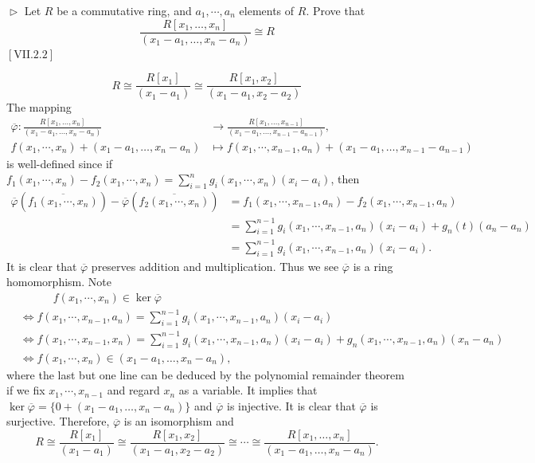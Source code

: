 \documentclass[12pt,letterpaper,boxed]{hmcpset}
\begin{document}
\hypertarget{Exercise III.4.12}{}
\begin{problem}[4.12]
	$\vartriangleright$ Let $R$ be a commutative ring, and $a_{1}, \cdots, a_{n}$ elements of $R .$ Prove that
	\[
	\frac{R\left[x_{1}, \ldots, x_{n}\right]}{\left(x_{1}-a_{1}, \ldots, x_{n}-a_{n}\right)} \cong R
	\]
	$[\mathrm{VII} .2 .2]$	
\end{problem}
\begin{solution}
	\[
	R\cong \frac{R\left[x_{1}\right]}{\left(x_{1}-a_{1}\right)}\cong \frac{R\left[x_{1},x_{2}\right]}{\left(x_{1}-a_{1},x_2-a_2\right)}
	\]
	The mapping
	\begin{align*}
	\overline{\varphi}:\frac{R\left[x_{1}, \ldots, x_{n}\right]}{\left(x_{1}-a_{1}, \ldots, x_{n}-a_{n}\right)}& \longrightarrow \frac{R\left[x_{1}, \ldots, x_{n-1}\right]}{\left(x_{1}-a_{1}, \ldots, x_{n-1}-a_{n-1}\right)},\\
	f(x_1,\cdots,x_n)+\left(x_{1}-a_{1}, \ldots, x_{n}-a_{n}\right)& \longmapsto f(x_1,\cdots,x_{n-1},a_n)+\left(x_{1}-a_{1}, \ldots, x_{n-1}-a_{n-1}\right)
	\end{align*}
	is well-defined since if $f_1\left(x_1,\cdots,x_n\right)-f_2\left(x_1,\cdots,x_n\right)=\sum\limits_{i=1}^n g_i(x_1,\cdots,x_n)(x_i-a_i)$, then
	\begin{align*}
	\overline{\varphi}\left(\overline{f_1(x_1,\cdots,x_n)}\right)-\overline{\varphi}\left(\overline{f_2(x_1,\cdots,x_n)}\right)&=f_1(x_1,\cdots,x_{n-1},a_n)-f_2(x_1,\cdots,x_{n-1},a_n)\\
	&=\sum_{i=1}^{n-1} g_i(x_1,\cdots,x_{n-1},a_n)(x_i-a_i)+g_n(t)(a_n-a_n)\\
	&=\sum_{i=1}^{n-1} g_i(x_1,\cdots,x_{n-1},a_n)(x_i-a_i).
	\end{align*}
	It is clear that $\overline{\varphi}$ preserves addition and multiplication. Thus we see $\overline{\varphi}$ is a ring homomorphism. Note
	\begin{align*}
	&\hspace{3em}f(x_1,\cdots,x_n)\in\ker \overline{\varphi}\\
	&\iff f(x_1,\cdots,x_{n-1},a_n)=\sum_{i=1}^{n-1} g_i(x_1,\cdots,x_{n-1},a_n)(x_i-a_i)\\
	&\iff f(x_1,\cdots,x_{n-1},x_n)=\sum_{i=1}^{n-1} g_i(x_1,\cdots,x_{n-1},a_n)(x_i-a_i)+g_n(x_1,\cdots,x_{n-1},a_n)(x_n-a_n)\\
	&\iff f(x_1,\cdots,x_n)\in\left(x_{1}-a_{1}, \ldots, x_{n}-a_{n}\right),
	\end{align*}
	where the last but one line can be deduced by the polynomial remainder theorem if we fix $x_1,\cdots,x_{n-1}$ and regard $x_n$ as a variable. It implies that $\ker \overline{\varphi}=\{0+\left(x_{1}-a_{1}, \ldots, x_{n}-a_{n}\right)\}$ and $\overline{\varphi}$ is injective. It is clear that $\overline{\varphi}$ is surjective. Therefore, $\overline{\varphi}$ is an isomorphism and 
	\[
	R\cong \frac{R\left[x_{1}\right]}{\left(x_{1}-a_{1}\right)}\cong \frac{R\left[x_{1},x_{2}\right]}{\left(x_{1}-a_{1},x_2-a_2\right)}\cong\cdots \cong \frac{R\left[x_{1}, \ldots, x_{n}\right]}{\left(x_{1}-a_{1}, \ldots, x_{n}-a_{n}\right)}.
	\]
\end{solution}
\end{document}
